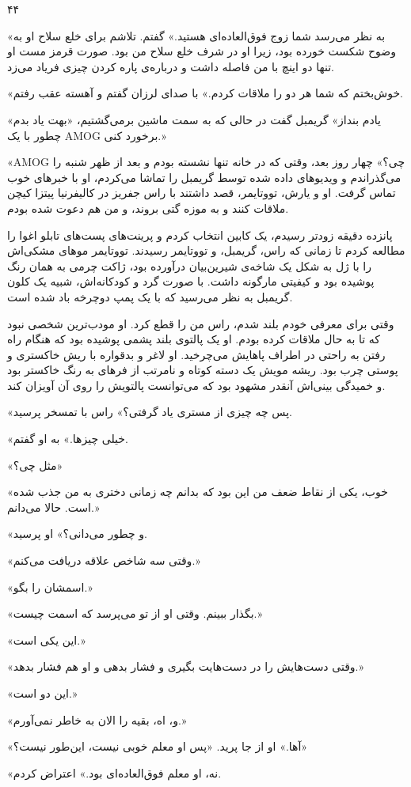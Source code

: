۴۴

«به نظر می‌رسد شما زوج فوق‌العاده‌ای هستید.» گفتم. تلاشم برای خلع سلاح او به وضوح شکست خورده بود، زیرا او در شرف خلع سلاح من بود. صورت قرمز مست او تنها دو اینچ با من فاصله داشت و درباره‌ی پاره کردن چیزی فریاد می‌زد.

«خوش‌بختم که شما هر دو را ملاقات کردم.» با صدای لرزان گفتم و آهسته عقب رفتم.

«یادم بنداز» گریمبل گفت در حالی که به سمت ماشین برمی‌گشتیم، «بهت یاد بدم چطور با یک AMOG برخورد کنی.»

«AMOG چی؟» چهار روز بعد، وقتی که در خانه تنها نشسته بودم و بعد از ظهر شنبه را می‌گذراندم و ویدیوهای داده شده توسط گریمبل را تماشا می‌کردم، او با خبرهای خوب تماس گرفت. او و یارش، تووتایمر، قصد داشتند با راس جفریز در کالیفرنیا پیتزا کیچن ملاقات کنند و به موزه گتی بروند، و من هم دعوت شده بودم.

پانزده دقیقه زودتر رسیدم، یک کابین انتخاب کردم و پرینت‌های پست‌های تابلو اغوا را مطالعه کردم تا زمانی که راس، گریمبل، و تووتایمر رسیدند. تووتایمر موهای مشکی‌اش را با ژل به شکل یک شاخه‌ی شیرین‌بیان درآورده بود، ژاکت چرمی به همان رنگ پوشیده بود و کیفیتی مارگونه داشت. با صورت گرد و کودکانه‌اش، شبیه یک کلون گریمبل به نظر می‌رسید که با یک پمپ دوچرخه باد شده است.

وقتی برای معرفی خودم بلند شدم، راس من را قطع کرد. او مودب‌ترین شخصی نبود که تا به حال ملاقات کرده بودم. او یک پالتوی بلند پشمی پوشیده بود که هنگام راه رفتن به راحتی در اطراف پاهایش می‌چرخید. او لاغر و بدقواره با ریش خاکستری و پوستی چرب بود. ریشه مویش یک دسته کوتاه و نامرتب از فرهای به رنگ خاکستر بود و خمیدگی بینی‌اش آنقدر مشهود بود که می‌توانست پالتویش را روی آن آویزان کند.

«پس چه چیزی از مستری یاد گرفتی؟» راس با تمسخر پرسید.

«خیلی چیزها.» به او گفتم.

«مثل چی؟»

«خوب، یکی از نقاط ضعف من این بود که بدانم چه زمانی دختری به من جذب شده است. حالا می‌دانم.»

«و چطور می‌دانی؟» او پرسید.

«وقتی سه شاخص علاقه دریافت می‌کنم.»

«اسمشان را بگو.»

«بگذار ببینم. وقتی او از تو می‌پرسد که اسمت چیست.»

«این یکی است.»

«وقتی دست‌هایش را در دست‌هایت بگیری و فشار بدهی و او هم فشار بدهد.»

«این دو است.»

«و، اه، بقیه را الان به خاطر نمی‌آورم.»

«آها.» او از جا پرید. «پس او معلم خوبی نیست، این‌طور نیست؟»

«نه، او معلم فوق‌العاده‌ای بود.» اعتراض کردم.